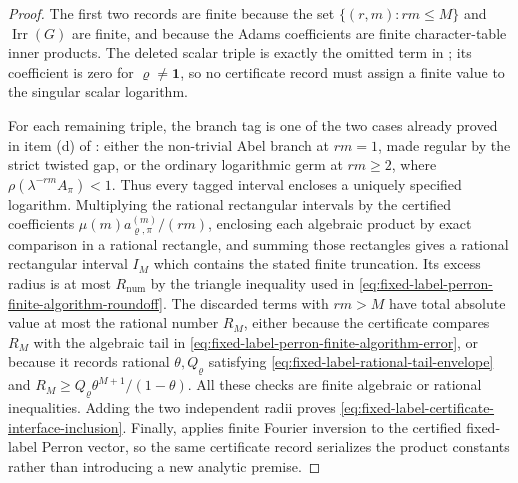 \documentclass[11pt,a4paper]{amsart}
\theoremstyle{plain}
\theoremstyle{definition}
\theoremstyle{remark}
\DeclareMathOperator{\Irr}{Irr}
\begin{document}
\begin{proof}
  The first two records are finite because the set
  \(\{(r,m):rm\le M\}\) and \(\Irr(G)\) are finite, and because the Adams
  coefficients are finite character-table inner products.  The deleted scalar
  triple is exactly the omitted term in
  ; its coefficient is zero for
  \(\varrho\ne\mathbf1\), so no certificate record must assign a finite value
  to the singular scalar logarithm.

  For each remaining triple, the branch tag is one of the two cases already
  proved in item \textup{(d)} of
  : either the non-trivial
  Abel branch at \(rm=1\), made regular by the strict twisted gap, or the
  ordinary logarithmic germ at \(rm\ge2\), where
  \(\rho(\lambda^{-rm}A_\pi)<1\).  Thus every tagged interval encloses a
  uniquely specified logarithm.  Multiplying the rational rectangular
  intervals by the certified coefficients \(\mu(m)a_{\varrho,\pi}^{(m)}/(rm)\),
  enclosing each algebraic product by exact comparison in a rational rectangle,
  and summing those rectangles gives a rational rectangular interval \(I_M\)
  which contains the stated finite truncation.  Its excess radius is at most
  \(R_{\mathrm{num}}\) by the triangle inequality used in
  \eqref{eq:fixed-label-perron-finite-algorithm-roundoff}.  The discarded
  terms with \(rm>M\) have total absolute value at most the rational number
  \(R_M\), either because the certificate compares \(R_M\) with the algebraic
  tail in \eqref{eq:fixed-label-perron-finite-algorithm-error}, or because it
  records rational \(\theta,Q_\varrho\) satisfying
  \eqref{eq:fixed-label-rational-tail-envelope} and
  \(R_M\ge Q_\varrho\theta^{M+1}/(1-\theta)\).  All these checks are finite
  algebraic or rational inequalities.  Adding the two independent radii proves
  \eqref{eq:fixed-label-certificate-interface-inclusion}.  Finally,
   applies finite Fourier inversion
  to the certified fixed-label Perron vector, so the same certificate record
  serializes the product constants rather than introducing a new analytic
  premise.
\end{proof}
\end{document}
